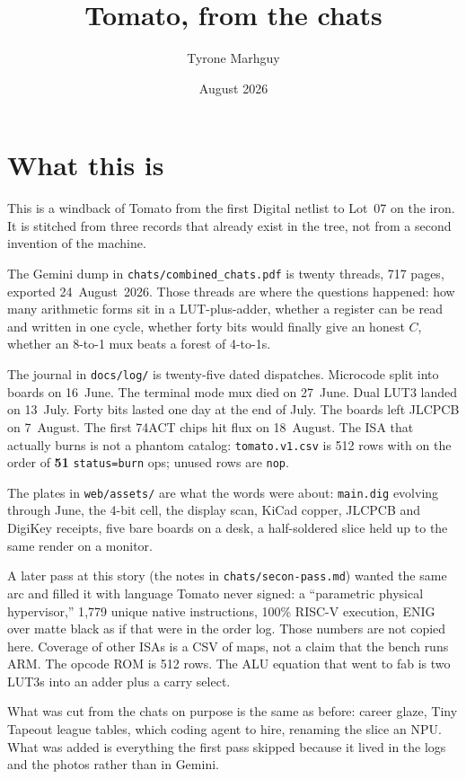 \documentclass[11pt,openany]{book}
\title{Tomato, from the chats}
\author{Tyrone Marhguy}
\date{August 2026}
\begin{document}
\frontmatter
\maketitle

\chapter*{What this is}

This is a windback of Tomato from the first Digital netlist to Lot~07 on the iron. It is stitched from three records that already exist in the tree, not from a second invention of the machine.

The Gemini dump in \texttt{chats/combined\_chats.pdf} is twenty threads, 717 pages, exported 24~August~2026. Those threads are where the questions happened: how many arithmetic forms sit in a LUT-plus-adder, whether a register can be read and written in one cycle, whether forty bits would finally give an honest $C$, whether an 8-to-1 mux beats a forest of 4-to-1s.

The journal in \texttt{docs/log/} is twenty-five dated dispatches. Microcode split into boards on 16~June. The terminal mode mux died on 27~June. Dual LUT3 landed on 13~July. Forty bits lasted one day at the end of July. The boards left JLCPCB on 7~August. The first 74ACT chips hit flux on 18~August. The ISA that actually burns is not a phantom catalog: \texttt{tomato.v1.csv} is 512 rows with on the order of \textbf{51} \texttt{status=burn} ops; unused rows are \texttt{nop}.

The plates in \texttt{web/assets/} are what the words were about: \texttt{main.dig} evolving through June, the 4-bit cell, the display scan, KiCad copper, JLCPCB and DigiKey receipts, five bare boards on a desk, a half-soldered slice held up to the same render on a monitor.

A later pass at this story (the notes in \texttt{chats/secon-pass.md}) wanted the same arc and filled it with language Tomato never signed: a ``parametric physical hypervisor,'' 1{,}779 unique native instructions, 100\% RISC-V execution, ENIG over matte black as if that were in the order log. Those numbers are not copied here. Coverage of other ISAs is a CSV of maps, not a claim that the bench runs ARM. The opcode ROM is 512 rows. The ALU equation that went to fab is two LUT3s into an adder plus a carry select.

What was cut from the chats on purpose is the same as before: career glaze, Tiny Tapeout league tables, which coding agent to hire, renaming the slice an NPU. What was added is everything the first pass skipped because it lived in the logs and the photos rather than in Gemini.
\end{document}
